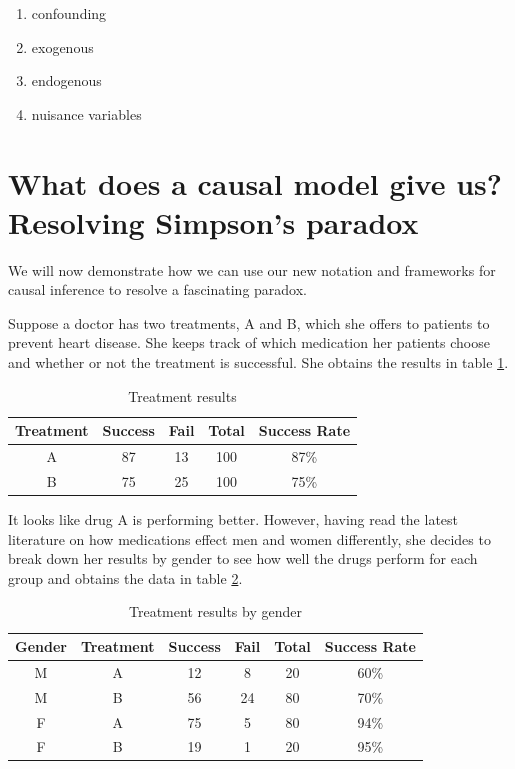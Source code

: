 \documentclass[11pt,a4paper,oneside]{book}
\theoremstyle{plain}
\theoremstyle{definition}
\begin{document}
\begin{enumerate}
\item confounding
\item exogenous
\item endogenous
\item nuisance variables
\end{enumerate} 

\section{What does a causal model give us? Resolving Simpson's paradox}

We will now demonstrate how we can use our new notation and frameworks for causal inference to resolve a fascinating paradox.  

\cite{simpson1951interpretation}

Suppose a doctor has two treatments, A and B, which she offers to patients to prevent heart disease. She keeps track of which medication her patients choose and whether or not the treatment is successful. She obtains the results in table \ref{tab:simpson1}.

\begin{table}[h]
\label{tab:simpson1}
\caption{Treatment results}
\center
\begin{tabular}{c c c c c}
Treatment & Success & Fail & Total & Success Rate\\
\hline
\rowcolor[gray]{0.9} 
A &  87 & 13 & 100 & 87\%\\
\rowcolor{white} B & 75 & 25 & 100 & 75\%\\
\hline
\end{tabular}
\end{table}

It looks like drug A is performing better. However, having read the latest literature on how medications effect men and women differently, she decides to break down her results by gender to see how well the drugs perform for each group and obtains the data in table \ref{tab:simpson2}.

\begin{table}[h]
\label{tab:simpson2}
\caption{Treatment results by gender}
\center
\begin{tabular}{c c c c c c}
Gender & Treatment & Success & Fail & Total & Success Rate\\
\hline
\rowcolor[gray]{0.9}
M & A & 12 & 8 & 20 & 60\%\\
M & B & 56 & 24 & 80 & 70\%\\
\rowcolor[gray]{0.9}
F & A & 75 & 5 & 80 & 94\%\\
F & B & 19 & 1 & 20 & 95\%\\
\hline
\end{tabular}
\end{table}
\end{document}
